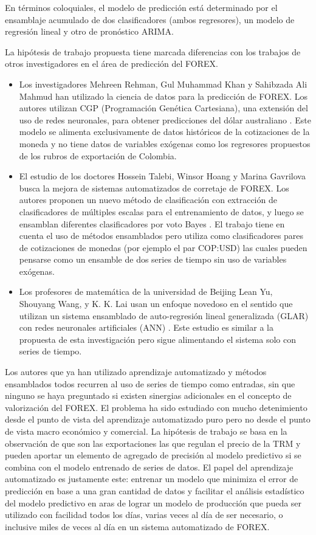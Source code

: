 En términos coloquiales, el modelo de predicción está determinado por el ensamblaje acumulado de dos clasificadores (ambos regresores), un modelo de regresión lineal y otro de pronóstico ARIMA.

La hipótesis de trabajo propuesta tiene marcada diferencias con los trabajos de otros investigadores en el área de predicción del FOREX. 

\begin{itemize}
\item Los investigadores Mehreen Rehman, Gul Muhammad Khan y Sahibzada Ali Mahmud han utilizado la ciencia de datos para la predicción de FOREX. Los autores utilizan CGP (Programación Genética Cartesiana), una extensión del uso de redes neuronales, para obtener predicciones del dólar australiano \cite{rehmanKhanMahmud}. Este modelo se alimenta exclusivamente de datos históricos de la cotizaciones de la moneda y no tiene datos de variables exógenas como los regresores propuestos de los rubros de exportación de Colombia. 
\item El estudio de los doctores Hossein Talebi, Winsor Hoang y Marina Gavrilova busca la mejora de sistemas automatizados de corretaje de FOREX. Los autores proponen un nuevo método de clasificación con extracción de clasificadores de múltiples escalas para el entrenamiento de datos, y luego se ensamblan diferentes clasificadores por voto Bayes \cite{talebiHoang}. El trabajo tiene en cuenta el uso de métodos ensamblados pero utiliza como clasificadores pares de cotizaciones de monedas (por ejemplo el par COP:USD) las cuales pueden pensarse como un ensamble de dos series de tiempo sin uso de variables exógenas. 
\item Los profesores de matemática de la universidad de Beijing Lean Yu, Shouyang Wang, y K. K. Lai usan un enfoque novedoso en el sentido que utilizan un sistema ensamblado de auto-regresión lineal generalizada (GLAR) con redes neuronales artificiales (ANN) \cite{yuWangLai}. Este estudio es similar a la propuesta de esta investigación pero sigue alimentando el sistema solo con series de tiempo.  
\end{itemize}

Los autores que ya han utilizado aprendizaje automatizado y métodos ensamblados todos recurren al uso de series de tiempo como entradas, sin que ninguno se haya preguntado si existen sinergias adicionales en el concepto de valorización del FOREX. El problema ha sido estudiado con mucho detenimiento desde el punto de vista del aprendizaje automatizado puro pero no desde el punto de vista macro económico y comercial. La hipótesis de trabajo se basa en la observación de que son las exportaciones las que regulan el precio de la TRM y pueden aportar un elemento de agregado de precisión al modelo predictivo si se combina con el modelo entrenado de series de datos. El papel del aprendizaje automatizado es justamente este: entrenar un modelo que minimiza el error de predicción en base a una gran cantidad de datos y facilitar el análisis estadístico del modelo predictivo en aras de lograr un modelo de producción que pueda ser utilizado con facilidad todos los días, varias veces al día de ser necesario, o inclusive miles de veces al día en un sistema automatizado de FOREX. 
